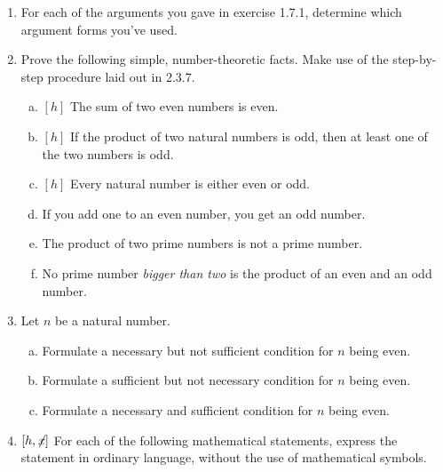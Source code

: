 \begin{enumerate}[{\thesection}.1]

	\item For each of the arguments you gave in exercise 1.7.1, determine which argument forms you've used.
		
	\item Prove the following simple, number-theoretic facts. Make use of the step-by-step procedure laid out in 2.3.7.
	
		\begin{enumerate}[(a)]

			\item $[h]$ The sum of two even numbers is even.
			
			\item $[h]$ If the product of two natural numbers is odd, then at least one of the two numbers is odd. 
			
			\item $[h]$ Every natural number is either even or odd.
			
			\item If you add one to an even number, you get an odd number.

			\item The product of two prime numbers is not a prime number.
			
			\item No prime number \emph{bigger than two} is the product of an even and an odd number.

		\end{enumerate}
		
	\item Let $n$ be a natural number. 
	
			\begin{enumerate}[(a)]

				\item Formulate a necessary but not sufficient condition for $n$ being even.

				\item Formulate a sufficient but not necessary condition for $n$ being even.
				
				\item Formulate a necessary and sufficient condition for $n$ being even.

			\end{enumerate}
	
	\item $[h,\not\hspace{-.5ex}x]$ For each of the following mathematical statements, express the statement in ordinary language, without the use of mathematical symbols.
	

\end{enumerate}
